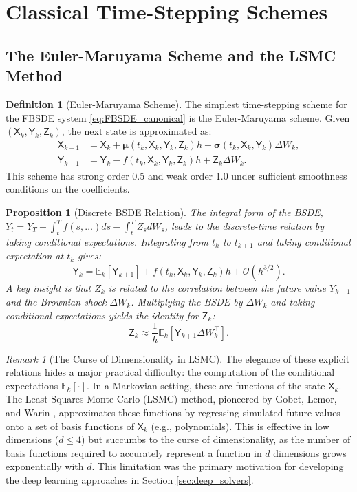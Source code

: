 \documentclass[11pt,letterpaper,oneside]{article}
\theoremstyle{plain}
\newtheorem{proposition}[theorem]{Proposition}
\theoremstyle{definition}
\newtheorem{definition}[theorem]{Definition}
\theoremstyle{remark}
\newtheorem{remark}{Remark}[section]
\begin{document}
\section{Classical Time-Stepping Schemes}
\label{sec:classical}

\subsection{The Euler-Maruyama Scheme and the LSMC Method}
\label{sec:euler_picard}

\begin{definition}[Euler-Maruyama Scheme]
The simplest time-stepping scheme for the FBSDE system \eqref{eq:FBSDE_canonical} is the Euler-Maruyama scheme. Given $(\mathsf{X}_k, \mathsf{Y}_k, \mathsf{Z}_k)$, the next state is approximated as:
\begin{align*}
\mathsf{X}_{k+1} &= \mathsf{X}_k + \bm{\mu}(t_k, \mathsf{X}_k, \mathsf{Y}_k, \mathsf{Z}_k)h + \bm{\sigma}(t_k, \mathsf{X}_k, \mathsf{Y}_k)\Delta W_k, \\
\mathsf{Y}_{k+1} &= \mathsf{Y}_k - f(t_k, \mathsf{X}_k, \mathsf{Y}_k, \mathsf{Z}_k)h + \mathsf{Z}_k \Delta W_k.
\end{align*}
This scheme has strong order 0.5 and weak order 1.0 under sufficient smoothness conditions on the coefficients.
\end{definition}

\begin{proposition}[Discrete BSDE Relation]
The integral form of the BSDE, \(Y_t = Y_T + \int_t^T f(s,\dots)ds - \int_t^T Z_s dW_s\), leads to the discrete-time relation by taking conditional expectations. Integrating from $t_k$ to $t_{k+1}$ and taking conditional expectation at $t_k$ gives:
\[
\mathsf{Y}_k = \mathbb{E}_k[\mathsf{Y}_{k+1}] + f(t_k, \mathsf{X}_k, \mathsf{Y}_k, \mathsf{Z}_k)h + \mathcal{O}(h^{3/2}).
\]
A key insight is that \(Z_k\) is related to the correlation between the future value \(Y_{k+1}\) and the Brownian shock \(\Delta W_k\). Multiplying the BSDE by \(\Delta W_k\) and taking conditional expectations yields the identity for \(\mathsf{Z}_k\):
\[
\mathsf{Z}_k \approx \frac{1}{h}\mathbb{E}_k[\mathsf{Y}_{k+1} \Delta W_k^\top].
\]
\end{proposition}

\begin{remark}[The Curse of Dimensionality in LSMC]
The elegance of these explicit relations hides a major practical difficulty: the computation of the conditional expectations \(\mathbb{E}_k[\cdot]\). In a Markovian setting, these are functions of the state \(\mathsf{X}_k\). The Least-Squares Monte Carlo (LSMC) method, pioneered by Gobet, Lemor, and Warin \cite{Gobet2005}, approximates these functions by regressing simulated future values onto a set of basis functions of \(\mathsf{X}_k\) (e.g., polynomials). This is effective in low dimensions (\(d \le 4\)) but succumbs to the curse of dimensionality, as the number of basis functions required to accurately represent a function in \(d\) dimensions grows exponentially with \(d\). This limitation was the primary motivation for developing the deep learning approaches in Section \ref{sec:deep_solvers}.
\end{remark}
\end{document}
